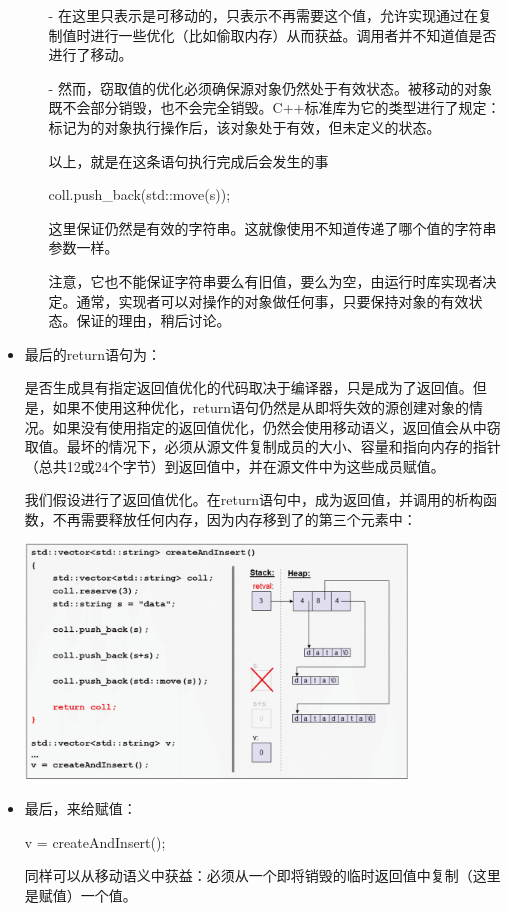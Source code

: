 \begin{itemize}
	\begin{itemize}
		\item[-] 在这里只表示是可移动的，只表示不再需要这个值，允许实现通过在复制值时进行一些优化（比如偷取内存）从而获益。调用者并不知道值是否进行了移动。
		\item[-] 然而，窃取值的优化必须确保源对象仍然处于有效状态。被移动的对象既不会部分销毁，也不会完全销毁。C++标准库为它的类型进行了规定：标记为的对象执行操作后，该对象处于有效，但未定义的状态。

		以上，就是在这条语句执行完成后会发生的事
\begin{cppcode}
coll.push_back(std::move(s));
\end{cppcode}
		这里保证仍然是有效的字符串。这就像使用不知道传递了哪个值的字符串参数一样。

		注意，它也不能保证字符串要么有旧值，要么为空，由运行时库实现者决定。通常，实现者可以对操作的对象做任何事，只要保持对象的有效状态。保证的理由，稍后讨论。
	\end{itemize}

	\item {}最后的return语句为：

	\begin{cppcode}
	return coll;
}
	\end{cppcode}
	是否生成具有指定返回值优化的代码取决于编译器，只是成为了返回值。但是，如果不使用这种优化，return语句仍然是从即将失效的源创建对象的情况。如果没有使用指定的返回值优化，仍然会使用移动语义，返回值会从中窃取值。最坏的情况下，必须从源文件复制成员的大小、容量和指向内存的指针（总共12或24个字节）到返回值中，并在源文件中为这些成员赋值。

	我们假设进行了返回值优化。在return语句中，成为返回值，并调用的析构函数，不再需要释放任何内存，因为内存移到了的第三个元素中：
\begin{center}
		\includegraphics[width=0.8\textwidth]{part1/ch1/images/15}
	\end{center}
	\item 最后，来给赋值：
\begin{cppcode}
v = createAndInsert();
\end{cppcode}
	同样可以从移动语义中获益：必须从一个即将销毁的临时返回值中复制（这里是赋值）一个值。


\end{itemize}
